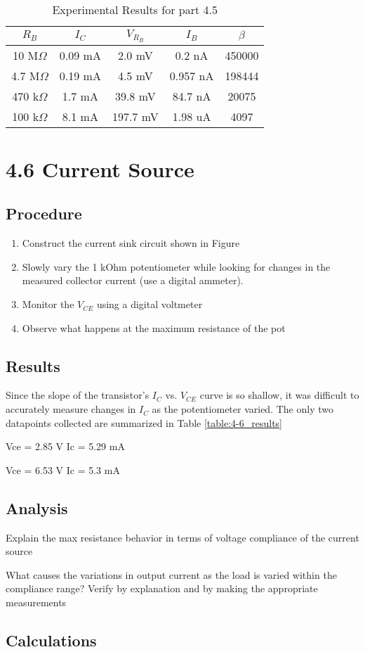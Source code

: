 \documentclass[12pt,letterpaper]{report}
\begin{document}
\begin{table}[ht]
\caption{Experimental Results for part 4.5} %
\centering 
    \begin{tabular}{| c | c | c | c | c |}
    \hline  
    $R_B$ & $I_C$ & $V_{R_B}$ & $I_B$ & $\beta$\\
    \hline
    10 M$\Omega$ & 0.09 mA & 2.0 mV   & 0.2 nA   & 450000 \\
    4.7 M$\Omega$ & 0.19 mA & 4.5 mV  & 0.957 nA & 198444 \\
    470 k$\Omega$ & 1.7 mA & 39.8 mV  & 84.7 nA  & 20075 \\
    100 k$\Omega$ & 8.1 mA & 197.7 mV & 1.98 uA  & 4097 \\
    \hline
    \end{tabular}
    \label{table:4-5_results}
\end{table}

\section*{4.6 Current Source}
\subsection*{Procedure}

\begin{enumerate}
\item Construct the current sink circuit shown in Figure %
\item Slowly vary the 1 kOhm potentiometer while looking for changes in the measured collector current (use a digital ammeter).
\item Monitor the $V_{CE}$ using a digital voltmeter
\item Observe what happens at the maximum resistance of the pot
\end{enumerate}

\subsection*{Results}
Since the slope of the transistor's $I_C$ vs. $V_{CE}$ curve is so shallow, it was difficult to accurately measure changes in $I_C$ as the potentiometer varied. The only two datapoints collected are summarized in Table \ref{table:4-6_results}

Vce = 2.85 V
Ic = 5.29 mA

Vce = 6.53 V
Ic = 5.3 mA

\subsection*{Analysis}

Explain the max resistance behavior in terms of voltage compliance of the current source

What causes the variations in output current as the load is varied within the compliance range? Verify by explanation and by making the appropriate measurements

\subsection*{Calculations}
\end{document}
